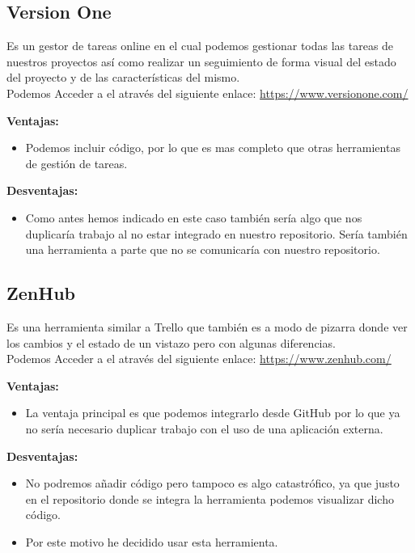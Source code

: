 \subsection{Version One}
Es un gestor de tareas online en el cual podemos gestionar todas las tareas de nuestros proyectos así como realizar un seguimiento de forma visual del estado del proyecto y de las características del mismo.\\ 
Podemos Acceder a el através del siguiente enlace: 
\url{https://www.versionone.com/}


\textbf{Ventajas:}

\begin{itemize}
\item Podemos incluir código, por lo que es mas completo que otras herramientas de gestión de tareas.
\end{itemize}

\textbf{Desventajas:}

\begin{itemize}
\item Como antes hemos indicado en este caso también sería algo que nos duplicaría trabajo al no estar integrado en nuestro repositorio. Sería también una herramienta a parte que no se comunicaría con nuestro repositorio.
\end{itemize}


\subsection{ZenHub}
Es una herramienta similar a Trello que también es a modo de pizarra donde ver los cambios y el estado de un vistazo pero con algunas diferencias.\\
Podemos Acceder a el através del siguiente enlace: 
\url{https://www.zenhub.com/}



\textbf{Ventajas:}

\begin{itemize}
\item La ventaja principal es que podemos integrarlo desde GitHub por lo que ya no sería necesario duplicar trabajo con el uso de una aplicación externa.
\end{itemize}

\textbf{Desventajas:}

\begin{itemize}
\item No podremos añadir código pero tampoco es algo catastrófico, ya que justo en el repositorio donde se integra la herramienta podemos visualizar dicho código.

\item Por este motivo he decidido usar esta herramienta.
\end{itemize}

